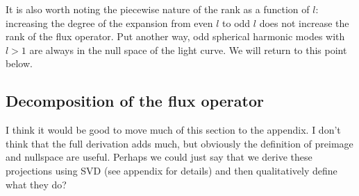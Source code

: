 \documentclass[modern]{aastex62}
\newcommand{\dfm}[1]{{\color{blue}#1}}
\begin{document}
It is also worth noting the piecewise nature of the rank as a function of
$l$: increasing the degree of the expansion from even $l$ to odd $l$ does not
increase the rank of the flux operator. Put another way, odd spherical
harmonic modes with $l > 1$ are always in the null space of the light curve.
We will return to this point below.

\subsection{Decomposition of the flux operator}
%
\dfm{I think it would be good to move much of this section to the appendix. I don't think that the full derivation adds much, but obviously the definition of preimage and nullspace are useful. Perhaps we could just say that we derive these projections using SVD (see appendix for details) and then qualitatively define what they do?}
\end{document}
